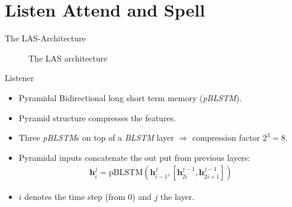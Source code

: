\documentclass{beamer}
\begin{document}
\section{Listen Attend and Spell}

\begin{frame}{The LAS-Architecture}
\begin{figure}

\caption{The LAS architecture}
\label{fig:las}
\end{figure}
\end{frame}

\begin{frame}{Listener}
\begin{itemize}
	\item Pyramidal Bidirectional long short term memory (\textit{pBLSTM}).
	\item Pyramid structure compresses the features. 
	\item Three \textit{pBLSTM}s on top of a \textit{BLSTM} layer $\Rightarrow$ compression factor $2^3 = 8 $.
	\item Pyramidal inputs concatenate the out put from previous layers:
		  \begin{align}
		  	\mathbf{h}_i^j = \text{pBLSTM}(\mathbf{h}_{i-1}^j, [\mathbf{h}_{2i}^{j-1}, \mathbf{h}_{2i+1}^{j-1}])
		  \end{align}
	\item $i$ denotes the time step (from $0$) and $j$ the layer.
\end{itemize}
\end{frame}
\end{document}
